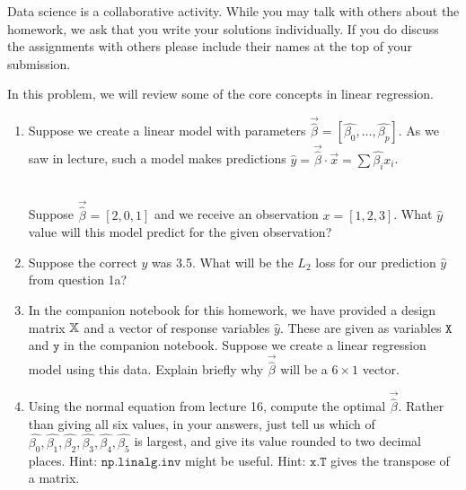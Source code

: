 \documentclass[addpoints, 12pt]{exam}
\begin{document}
\begin{questions}



Data science is a collaborative activity. While you may talk with others about the homework, we ask that you write your solutions individually. If you do discuss the assignments with others please include their names at the top of your submission.

\newpage


\question In this problem, we will review some of the core concepts in linear regression.

\begin{enumerate}[label=\alph*.]

\item Suppose we create a linear model with parameters $\vec{\hat{\beta}} = [\hat{\beta_0}, \ldots, \hat{\beta_p}]$. As we saw in lecture, such a model makes predictions $\hat{y} = \vec{\hat{\beta}} \cdot \vec{x} = \sum \hat{\beta_i} x_i $.

\\

Suppose $\vec{\hat{\beta}} = [2, 0, 1]$ and we receive an observation $x = [1, 2, 3]$. What $\hat{y}$ value will this model predict for the given observation?

\item Suppose the correct $y$ was 3.5. What will be the $L_2$ loss for our prediction $\hat{y}$ from question 1a?

\item In the companion notebook for this homework, we have provided a design matrix $\Bbb{X}$ and a vector of response variables $\hat{y}$. These are given as variables $\texttt{X}$ and $\texttt{y}$ in the companion notebook. Suppose we create a linear regression model using this data. Explain briefly why $\vec{\hat{\beta}}$ will be a $6 \times 1$ vector.

\item Using the normal equation from lecture 16, compute the optimal $\vec{\hat{\beta}}$. Rather than giving all six values, in your answers, just tell us which of $\hat{\beta_0}, \hat{\beta_1}, \hat{\beta_2}, \hat{\beta_3}, \hat{\beta_4}, \hat{\beta_5}$ is largest, and give its value rounded to two decimal places. Hint: $\texttt{np.linalg.inv}$ might be useful. Hint: $\texttt{x.T}$ gives the transpose of a matrix.


\end{enumerate}
\end{questions}
\end{document}
